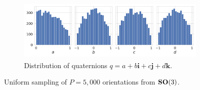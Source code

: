 \begin{figure}[ht!]
\begin{subfigure}[b]{0.66\linewidth}
        \centering
        \includegraphics[height=8em]{figures/uniform_quaternions_q.pdf}
        \caption{Distribution of quaternions $q = a + b\boldsymbol{i} + c\boldsymbol{j} + d\boldsymbol{k}$.}
    \end{subfigure}
    \caption{%
        Uniform sampling of $P=5,000$ orientations from $\mathrm{\mathbf{SO}}(3)$.
        }\label{fig:uniform-orientations}
\end{figure}

